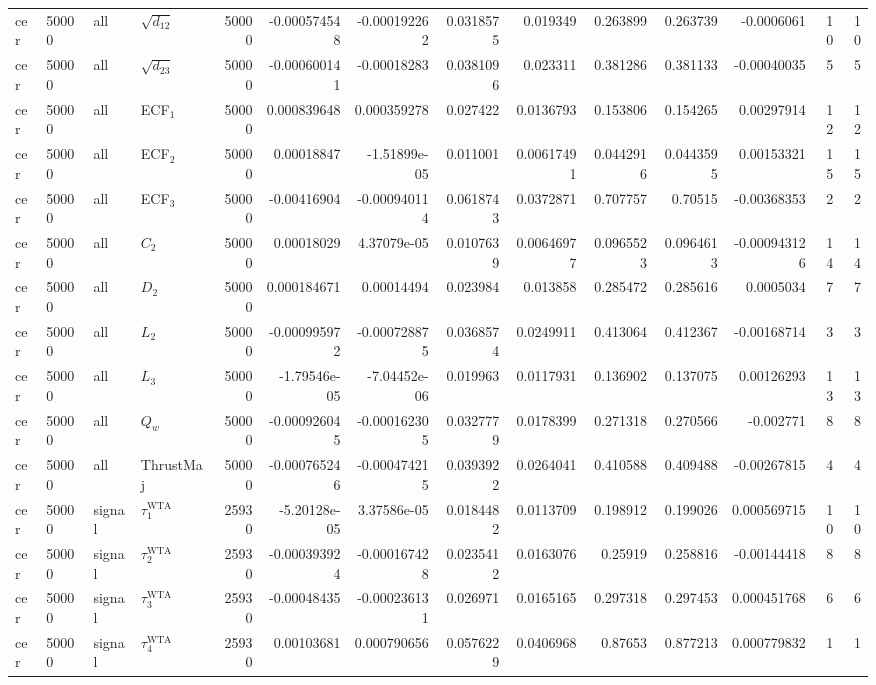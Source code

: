 \begin{landscape}
\begin{longtable}{llll r rrrr rr r rr}
cer & 50000 & all & $\sqrt{d_{12}}$ & 50000 & -0.000574548 & -0.000192262 & 0.0318575 & 0.019349 & 0.263899 & 0.263739 & -0.0006061 & 10 & 10 \\
cer & 50000 & all & $\sqrt{d_{23}}$ & 50000 & -0.000600141 & -0.00018283 & 0.0381096 & 0.023311 & 0.381286 & 0.381133 & -0.00040035 & 5 & 5 \\
cer & 50000 & all & ECF$_1$ & 50000 & 0.000839648 & 0.000359278 & 0.027422 & 0.0136793 & 0.153806 & 0.154265 & 0.00297914 & 12 & 12 \\
cer & 50000 & all & ECF$_2$ & 50000 & 0.00018847 & -1.51899e-05 & 0.011001 & 0.00617491 & 0.0442916 & 0.0443595 & 0.00153321 & 15 & 15 \\
cer & 50000 & all & ECF$_3$ & 50000 & -0.00416904 & -0.000940114 & 0.0618743 & 0.0372871 & 0.707757 & 0.70515 & -0.00368353 & 2 & 2 \\
cer & 50000 & all & $C_2$ & 50000 & 0.00018029 & 4.37079e-05 & 0.0107639 & 0.00646977 & 0.0965523 & 0.0964613 & -0.000943126 & 14 & 14 \\
cer & 50000 & all & $D_2$ & 50000 & 0.000184671 & 0.00014494 & 0.023984 & 0.013858 & 0.285472 & 0.285616 & 0.0005034 & 7 & 7 \\
cer & 50000 & all & $L_2$ & 50000 & -0.000995972 & -0.000728875 & 0.0368574 & 0.0249911 & 0.413064 & 0.412367 & -0.00168714 & 3 & 3 \\
cer & 50000 & all & $L_3$ & 50000 & -1.79546e-05 & -7.04452e-06 & 0.019963 & 0.0117931 & 0.136902 & 0.137075 & 0.00126293 & 13 & 13 \\
cer & 50000 & all & $Q_w$ & 50000 & -0.000926045 & -0.000162305 & 0.0327779 & 0.0178399 & 0.271318 & 0.270566 & -0.002771 & 8 & 8 \\
cer & 50000 & all & ThrustMaj & 50000 & -0.000765246 & -0.000474215 & 0.0393922 & 0.0264041 & 0.410588 & 0.409488 & -0.00267815 & 4 & 4 \\
cer & 50000 & signal & $\tau_1^{\mathrm{WTA}}$ & 25930 & -5.20128e-05 & 3.37586e-05 & 0.0184482 & 0.0113709 & 0.198912 & 0.199026 & 0.000569715 & 10 & 10 \\
cer & 50000 & signal & $\tau_2^{\mathrm{WTA}}$ & 25930 & -0.000393924 & -0.000167428 & 0.0235412 & 0.0163076 & 0.25919 & 0.258816 & -0.00144418 & 8 & 8 \\
cer & 50000 & signal & $\tau_3^{\mathrm{WTA}}$ & 25930 & -0.00048435 & -0.000236131 & 0.026971 & 0.0165165 & 0.297318 & 0.297453 & 0.000451768 & 6 & 6 \\
cer & 50000 & signal & $\tau_4^{\mathrm{WTA}}$ & 25930 & 0.00103681 & 0.000790656 & 0.0576229 & 0.0406968 & 0.87653 & 0.877213 & 0.000779832 & 1 & 1 \\

\end{longtable}
\end{landscape}
